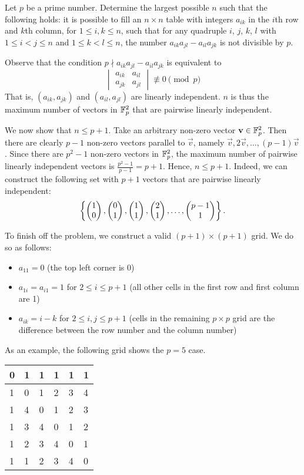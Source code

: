 \begin{question}[$p+1$]\label{A::2024-O-2-5}
    Let $p$ be a prime number. Determine the largest possible $n$ such that the following holds: it is possible to fill an $n \times n$ table with integers $a_{ik}$ in the $i$th row and $k$th column, for $1 \leq i, k \leq n$, such that for any quadruple $i$, $j$, $k$, $l$ with $1 \leq i < j \leq n$ and $1 \leq k < l \leq n$, the number $a_{ik}a_{jl} - a_{il}a_{jk}$ is not divisible by $p$.
\end{question}
\begin{solution*}
    Observe that the condition $p \nmid a_{ik}a_{jl} - a_{il}a_{jk}$ is equivalent to \[
    \begin{vmatrix}
        a_{ik} & a_{il}\\
        a_{jk} & a_{jl}
    \end{vmatrix} \not\equiv 0 \pmod{p}\] That is, $(a_{ik}, a_{jk})$ and $(a_{il}, a_{jl})$ are linearly independent. $n$ is thus the maximum number of vectors in $\mathbb{F}_p^2$ that are pairwise linearly independent. 

    We now show that $n \leq p + 1$. Take an arbitrary non-zero vector $\mathbf{v} \in \mathbb{F}_p^2$. Then there are clearly $p-1$ non-zero vectors parallel to $\vec v$, namely $\vec v, 2\vec v, \ldots, (p-1)\vec v$. Since there are $p^2 - 1$ non-zero vectors in $\mathbb{F}_p^2$, the maximum number of pairwise linearly independent vectors is $\frac{p^2 - 1}{p - 1} = p + 1$. Hence, $n \leq p+1$. Indeed, we can construct the following set with $p+1$ vectors that are pairwise linearly independent: \[\left\lbrace \begin{pmatrix} 1 \\ 0 \end{pmatrix}, \begin{pmatrix} 0 \\ 1 \end{pmatrix}, \begin{pmatrix} 1 \\ 1 \end{pmatrix}, \begin{pmatrix} 2 \\ 1 \end{pmatrix}, \ldots, \begin{pmatrix} p-1 \\ 1 \end{pmatrix} \right\rbrace.\]

    To finish off the problem, we construct a valid $(p + 1) \times (p + 1)$ grid. We do so as follows:
    \begin{itemize}
        \item $a_{11} = 0$ (the top left corner is 0)
        \item $a_{1i} = a_{i1} = 1$ for $2 \leq i \leq p+1$ (all other cells in the first row and first column are 1)
        \item $a_{ik} = i-k$ for $2 \leq i, j \leq p + 1$ (cells in the remaining $p \times p$ grid are the difference between the row number and the column number)
    \end{itemize}
    As an example, the following grid shows the $p = 5$ case.
    \begin{table}[h]
        \centering
        \begin{tabular}{|l|l|l|l|l|l|}
        \hline
        0 & 1 & 1 & 1 & 1 & 1 \\ \hline
        1 & 0 & 1 & 2 & 3 & 4 \\ \hline
        1 & 4 & 0 & 1 & 2 & 3 \\ \hline
        1 & 3 & 4 & 0 & 1 & 2 \\ \hline
        1 & 2 & 3 & 4 & 0 & 1 \\ \hline
        1 & 1 & 2 & 3 & 4 & 0 \\ \hline
        \end{tabular}
    \end{table}


\end{solution*}
